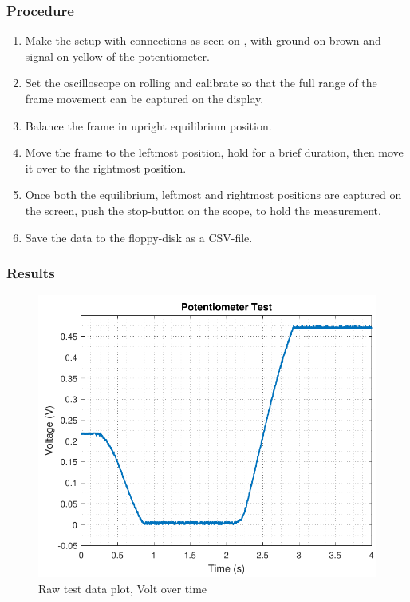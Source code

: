 \subsubsection{Procedure}
\begin{enumerate}
  \item Make the setup with connections as seen on , with ground on brown and signal on yellow of the potentiometer.
  \item Set the oscilloscope on rolling and calibrate so that the full range of the frame movement can be captured on the display.
  \item Balance the frame in upright equilibrium position.
	\item Move the frame to the leftmost position, hold for a brief duration, then move it over to the rightmost position.
	\item Once both the equilibrium, leftmost and rightmost positions are captured on the screen, push the stop-button on the scope, to hold the measurement.
	\item Save the data to the floppy-disk as a CSV-file.
\end{enumerate}

\subsubsection{Results}
\begin{figure}[H] 
	\centering 
	\includegraphics[scale=0.7]{figures/TestPotentiometerResolution}
	\caption{Raw test data plot, Volt over time}
	\label{comparisonRealModel}
\end{figure}